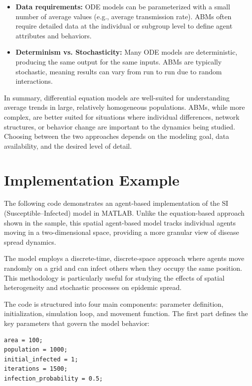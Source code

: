 \documentclass{article}
\begin{document}
\begin{itemize}
    \item \textbf{Data requirements:} ODE models can be parameterized with a small number of average values (e.g., average transmission rate). ABMs often require detailed data at the individual or subgroup level to define agent attributes and behaviors.
    
    \item \textbf{Determinism vs. Stochasticity:} Many ODE models are deterministic, producing the same output for the same inputs. ABMs are typically stochastic, meaning results can vary from run to run due to random interactions.
\end{itemize}

In summary, differential equation models are well-suited for understanding average trends in large, relatively homogeneous populations. ABMs, while more complex, are better suited for situations where individual differences, network structures, or behavior change are important to the dynamics being studied. Choosing between the two approaches depends on the modeling goal, data availability, and the desired level of detail.

\section{Implementation Example}
The following code demonstrates an agent-based implementation of the SI (Susceptible–Infected) model in MATLAB. Unlike the equation-based approach shown in the sample, this spatial agent-based model tracks individual agents moving in a two-dimensional space, providing a more granular view of disease spread dynamics.

The model employs a discrete-time, discrete-space approach where agents move randomly on a grid and can infect others when they occupy the same position. This methodology is particularly useful for studying the effects of spatial heterogeneity and stochastic processes on epidemic spread.

The code is structured into four main components: parameter definition, initialization, simulation loop, and movement function. The first part defines the key parameters that govern the model behavior:

\begin{lstlisting}[caption={Parameteres}]
% ----- Parameters -----
area = 100;
population = 1000;
initial_infected = 1;
iterations = 1500;
infection_probability = 0.5;
\end{lstlisting}
\end{document}
